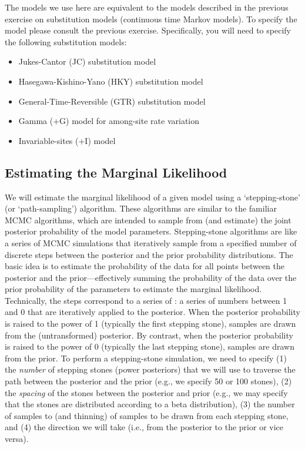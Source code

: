 The models we use here are equivalent to the models described in the previous exercise on substitution models (continuous time Markov models).
To specify the model please consult the previous exercise. Specifically, you will need to specify the following substitution models:
\begin{itemize}
\item Jukes-Cantor (JC) substitution model \citep[][]{Jukes1969}
\item Hasegawa-Kishino-Yano (HKY) substitution model \citep[][]{Hasegawa1985}
\item General-Time-Reversible (GTR) substitution model \citep[][]{Tavare1986}
\item Gamma (+G) model for among-site rate variation \citep[][]{yang94a}
\item Invariable-sites (+I) model \citep[][]{Hasegawa1985}
\end{itemize}


\bigskip
\subsection{Estimating the Marginal Likelihood}

We will estimate the marginal likelihood of a given model using a `stepping-stone' (or `path-sampling') algorithm.
These algorithms are similar to the familiar MCMC algorithms, which are intended to sample from (and estimate) the joint posterior probability of the model parameters.
Stepping-stone algorithms are like a series of MCMC simulations that iteratively sample from a specified number of discrete steps between the posterior and the prior probability distributions.
The basic idea is to estimate the probability of the data for all points between the posterior and the prior---effectively summing the probability of the data over the prior probability of the parameters to estimate the marginal likelihood. 
Technically, the steps correspond to a series of : a series of numbers between 1 and 0 that are iteratively applied to the posterior.
When the posterior probability is raised to the power of 1 (typically the first stepping stone), samples are drawn from the (untransformed) posterior.
By contrast, when the posterior probability is raised to the power of 0 (typically the last stepping stone), samples are drawn from the prior.
To perform a stepping-stone simulation, we need to specify (1) the \emph{number} of stepping stones (power posteriors) that we will use to traverse the path between the posterior and the prior (e.g., we specify 50 or 100 stones), (2) the \emph{spacing} of the stones between the posterior and prior (e.g., we may specify that the stones are distributed according to a beta distribution), (3) the number of samples to (and thinning) of samples to be drawn from each stepping stone, and (4) the direction we will take (i.e., from the posterior to the prior or vice versa).

